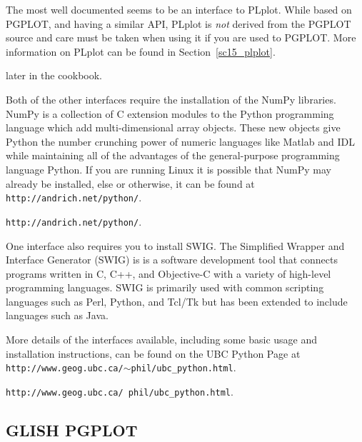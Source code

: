 \documentclass[twoside,11pt]{article}
\newcommand{\htmladdnormallink}[2]{#1}
\newcommand{\htmlref}[2]{#1}
\newcommand{\latex}[1]{#1}
\newcommand{\xlabel}[1]{}
\begin{document}
The most well documented seems to be an interface to
\htmladdnormallink{PLplot}{http://emma.la.asu.edu/plplot/}. While
based on PGPLOT, and having a similar API, PLplot is {\em not} derived
from the PGPLOT source and care must be taken when using it if you are
used to PGPLOT. More information on PLplot can be found \latex{ in
Section~\ref{sc15_plplot}.}
\begin{htmlonly}
\htmlref{later}{sc15_plplot} in the cookbook.
\end{htmlonly}

Both of the other interfaces require the installation of the
\htmladdnormallink{NumPy}{http://www.python.org/topics/scicomp/numpy.html}
libraries. NumPy is a collection of C extension modules to the Python
programming language which add multi-dimensional array objects. These
new objects give Python the number crunching power of numeric
languages like Matlab and IDL while maintaining all of the advantages
of the general-purpose programming language Python. If you are running
Linux it is possible that NumPy may already be installed, else or
otherwise, it can be found at \latex{{\tt
http://andrich.net/python/}.} 
\begin{htmlonly} 
\htmladdnormallink{{\tt http://andrich.net/python/}}{http://andrich.net/python/}.
\end{htmlonly} 

One interface also requires you to install
\htmladdnormallink{SWIG}{http://www.swig.org/}. The Simplified Wrapper
and Interface Generator (SWIG) is is a software development tool that
connects programs written in C, C++, and Objective-C with a variety of
high-level programming languages. SWIG is primarily used with common
scripting languages such as Perl, Python, and Tcl/Tk but has been
extended to include languages such as Java.

More details of the interfaces available, including some basic usage
and installation instructions, can be found on the UBC Python Page at
\latex{{\tt http://www.geog.ubc.ca/$\sim$phil/ubc\_python.html}.}
\begin{htmlonly} 
\htmladdnormallink{{\tt http://www.geog.ubc.ca/~phil/ubc_python.html}}{http://www.geog.ubc.ca/~phil/ubc_python.html}.
\end{htmlonly}

\subsection{\xlabel{sc15_pgglish}GLISH PGPLOT\label{sc15_pgglish}}
\end{document}
